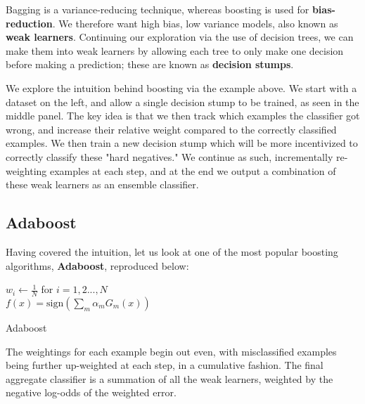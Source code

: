 \documentclass{article}
\begin{document}
Bagging is a variance-reducing technique, whereas boosting is used for {\bf bias-reduction}.  We therefore want high bias, low variance models, also known as {\bf weak learners}.  Continuing our exploration via the use of decision trees, we can make them into weak learners by allowing each tree to only make one decision before making a prediction; these are known as {\bf decision stumps}.


We explore the intuition behind boosting via the example above.  We start with a dataset on the left, and allow a single decision stump to be trained, as seen in the middle panel.  The key idea is that we then track which examples the classifier got wrong, and increase their relative weight compared to the correctly classified examples.  We then train a new decision stump which will be more incentivized to correctly classify these "hard negatives."  We continue as such, incrementally re-weighting examples at each step, and at the end we output a combination of these weak learners as an ensemble classifier.

\subsection{Adaboost}

Having covered the intuition, let us look at one of the most popular boosting algorithms, {\bf Adaboost}, reproduced below:

\begin{algorithm}[H]
\SetAlgoLined
{}
 $w_i \gets \frac{1}{N}$ for $i = 1, 2 ..., N$ \\
 $f(x) = \text{sign}(\sum_m \alpha_m G_m(x))$
 \caption{Adaboost}
\end{algorithm}

The weightings for each example begin out even, with misclassified examples being further up-weighted at each step, in a cumulative fashion.  The final aggregate classifier is a summation of all the weak learners, weighted by the negative log-odds of the weighted error. 
\end{document}
